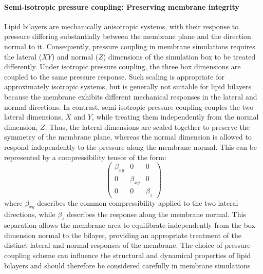 \paragraph{Semi-isotropic pressure coupling: Preserving membrane integrity}
Lipid bilayers are mechanically anisotropic systems, with their response to pressure differing substantially between the membrane plane and the direction normal to it. Consequently, pressure coupling in membrane simulations requires the lateral ($XY$) and normal ($Z$) dimensions of the simulation box to be treated differently.
Under isotropic pressure coupling, the three box dimensions are coupled to the same pressure response. Such scaling is appropriate for approximately isotropic systems, but is generally not suitable for lipid bilayers because the membrane exhibits different mechanical responses in the lateral and normal directions. In contrast, semi-isotropic pressure coupling couples the two lateral dimensions, $X$ and $Y$, while treating them independently from the normal dimension, $Z$.
Thus, the lateral dimensions are scaled together to preserve the symmetry of the membrane plane, whereas the normal dimension is allowed to respond independently to the pressure along the membrane normal. This can be represented by a compressibility tensor of the form:
\begin{equation}
\begin{pmatrix}
\beta_{xy} & 0 & 0 \\
0 & \beta_{xy} & 0 \\
0 & 0 & \beta_z
\end{pmatrix}
\end{equation}
where $\beta_{xy}$ describes the common compressibility applied to the two lateral directions, while $\beta_z$ describes the response along the membrane normal.
This separation allows the membrane area to equilibrate independently from the box dimension normal to the bilayer, providing an appropriate treatment of the distinct lateral and normal responses of the membrane. The choice of pressure-coupling scheme can influence the structural and dynamical properties of lipid bilayers and should therefore be considered carefully in membrane simulations~\cite{Ivanova2018,Gromacs2015,10.1371/journal.pcbi.1000810}














